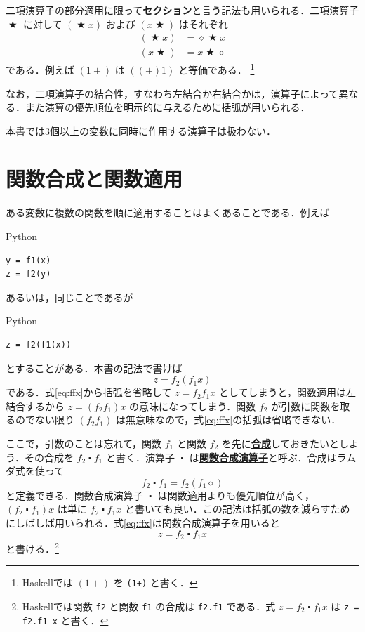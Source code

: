 \documentclass[a4paper,twocolumn]{jsbook}
\newcommand{\programminglanguage}[1]{\textsf{#1}}
\newcommand{\haskell}{\programminglanguage{Haskell}}
\newcommand{\python}{\programminglanguage{Python}}
\newcommand{\keyword}[1]{{\underline{\textbf{#1}}}}
\newcommand{\code}[1]{\texttt{#1}}
\newenvironment{pythoncode}{\begin{itembox}[r]{\python}}{\end{itembox}}
\newcommand{\mAnonParam}{\diamond}
\DeclareMathOperator{\mBinOp}{\bigstar}
\DeclareMathOperator{\mComp}{\centerdot}
\begin{document}
二項演算子の部分適用に限って\keyword{セクション}と言う記法も用いられる．二項演算子 $\mBinOp$ に対して $(\mBinOp x)$ および $(x\mBinOp)$ はそれぞれ
\begin{align}
(\mBinOp x)&=\mAnonParam\mBinOp x\\
(x\mBinOp)&=x\mBinOp\mAnonParam
\end{align}
である．例えば $(1+)$ は $((+)1)$ と等価である． \footnote{\haskell では $(1+)$ を \code{(1+)} と書く．}

なお，二項演算子の結合性，すなわち左結合か右結合かは，演算子によって異なる．また演算の優先順位を明示的に与えるために括弧が用いられる．

本書では3個以上の変数に同時に作用する演算子は扱わない．

\section{関数合成と関数適用}

ある変数に複数の関数を順に適用することはよくあることである．例えば
\begin{pythoncode}
\begin{verbatim}
y = f1(x)
z = f2(y)
\end{verbatim}
\end{pythoncode}
あるいは，同じことであるが
\begin{pythoncode}
\begin{verbatim}
z = f2(f1(x))
\end{verbatim}
\end{pythoncode}
とすることがある．本書の記法で書けば
\begin{equation}
\label{eq:ffx}
z=f_2(f_1x)
\end{equation}
である．式\eqref{eq:ffx}から括弧を省略して $z=f_2f_1x$ としてしまうと，関数適用は左結合するから $z=(f_2f_1)x$ の意味になってしまう．関数 $f_2$ が引数に関数を取るのでない限り $(f_2f_1)$ は無意味なので，式\eqref{eq:ffx}の括弧は省略できない．

ここで，引数のことは忘れて，関数 $f_1$ と関数 $f_2$ を先に\keyword{合成}しておきたいとしよう．その合成を $f_2\mComp f_1$ と書く．演算子 $\mComp$ は\keyword{関数合成演算子}と呼ぶ．合成はラムダ式を使って
\begin{equation}
f_2\mComp f_1=f_2(f_1\mAnonParam)
\end{equation}
と定義できる．関数合成演算子 $\mComp$ は関数適用よりも優先順位が高く，$\left(f_2\mComp f_1\right)x$ は単に $f_2\mComp f_1x$ と書いても良い．この記法は括弧の数を減らすためにしばしば用いられる．式\eqref{eq:ffx}は関数合成演算子を用いると
\begin{equation}
z=f_2\mComp f_1x
\end{equation}
と書ける．\footnote{\haskell では関数 \code{f2} と関数 \code{f1} の合成は \code{f2.f1} である．式 $z=f_2\mComp f_1x$ は \code{z = f2.f1 x} と書く．}
\end{document}
